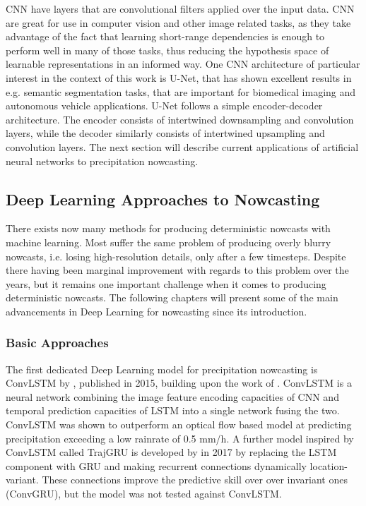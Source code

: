 CNN have layers that are convolutional filters applied over the input data. CNN are great for use in computer vision and other image related tasks, as they take advantage of the fact that learning short-range dependencies is enough to perform well in many of those tasks, thus reducing the hypothesis space of learnable representations in an informed way. One CNN architecture of particular interest in the context of this work is U-Net, that has shown excellent results in e.g. semantic segmentation tasks, that are important for biomedical imaging and autonomous vehicle applications. U-Net follows a simple encoder-decoder architecture. The encoder consists of intertwined downsampling and convolution layers, while the decoder similarly consists of intertwined upsampling and convolution layers. The next section will describe current applications of artificial neural networks to precipitation nowcasting.



\subsection{Deep Learning Approaches to Nowcasting}


There exists now many methods for producing deterministic nowcasts with machine learning. Most suffer the same problem of producing overly blurry nowcasts, i.e. losing high-resolution details, only after a few timesteps. Despite there having been marginal improvement with regards to this problem over the years, but it remains one important challenge when it comes to producing deterministic nowcasts. The following chapters will present some of the main advancements in Deep Learning for nowcasting since its introduction.

\subsubsection*{Basic Approaches}
 
The first dedicated Deep Learning model for precipitation nowcasting is ConvLSTM by \citet{shi_convolutional_2015}, published in 2015, building upon the work of \citet{oh_action-conditional_2015}. ConvLSTM is a neural network combining the image feature encoding capacities of CNN and  temporal prediction capacities of LSTM into a single network fusing the two. ConvLSTM was shown to outperform an optical flow based model at predicting precipitation exceeding a low rainrate of 0.5 mm/h. 
A further model inspired by ConvLSTM called TrajGRU is developed by \citet{shi_deep_2017} in 2017 by replacing the LSTM component with GRU and making recurrent connections dynamically location-variant. These connections improve the predictive skill over over invariant ones (ConvGRU), but the model was not tested against ConvLSTM. 

